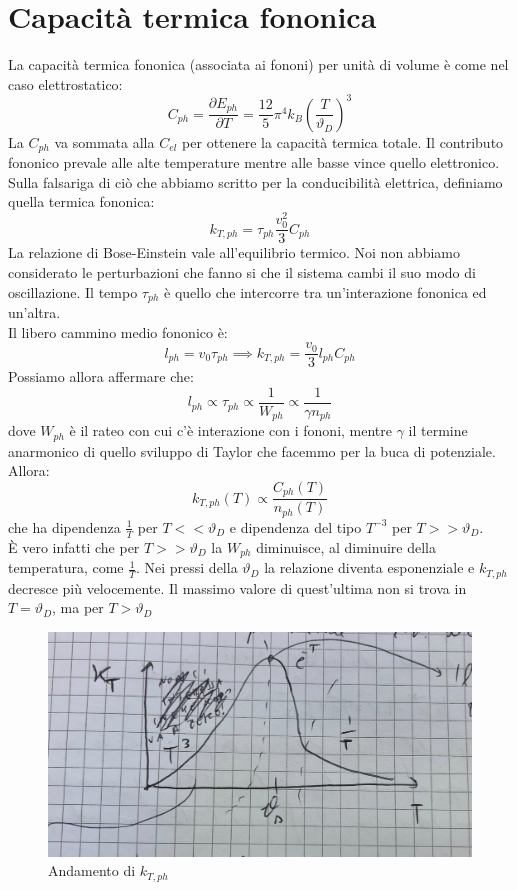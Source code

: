 \documentclass{book}
\begin{document}
    \section{Capacità termica fononica}
        La capacità termica fononica (associata ai fononi) per unità di volume è come nel caso elettrostatico:
        $$C_{ph} = \frac{\partial E_{ph}}{\partial T} = \frac{12}{5}\pi ^{4}k_{B}(\frac{T}{\vartheta_{D}})^{3}$$
        La $C_{ph}$ va sommata alla $C_{el}$ per ottenere la capacità termica totale. Il contributo fononico prevale alle alte temperature mentre alle basse vince quello elettronico.\\
        Sulla falsariga di ciò che abbiamo scritto per la conducibilità elettrica, definiamo quella termica fononica:
        $$k_{T, ph} = \tau_{ph} \frac{v_{0} ^{2}}{3}C_{ph}$$
        La relazione di Bose-Einstein vale all'equilibrio termico. Noi non abbiamo considerato le perturbazioni che fanno si che il sistema cambi il suo modo di oscillazione. Il tempo $\tau_{ph}$ è quello che intercorre tra un'interazione fononica ed un'altra.\\
        Il libero cammino medio fononico è:
        $$l_{ph} = v_{0} \tau_{ph} \implies k_{T,ph} = \frac{v_{0}}{3}l_{ph}C_{ph}$$
        Possiamo allora affermare che:
        $$l_{ph} \propto \tau_{ph} \propto \frac{1}{W_{ph}} \propto \frac{1}{\gamma n_{ph}}$$
        dove $W_{ph}$ è il rateo con cui c'è interazione con i fononi, mentre $\gamma$ il termine anarmonico di quello sviluppo di Taylor che facemmo per la buca di potenziale.\\
        Allora:
        $$k_{T, ph} (T) \propto \frac{C_{ph}(T)}{n_{ph}(T)}$$
        che ha dipendenza $\displaystyle \frac{1}{T}$ per $T<< \vartheta_{D}$ e dipendenza del tipo $T^{-3}$ per $T>> \vartheta_{D}$.\\
        È vero infatti che per $T>> \vartheta_{D}$ la $W_{ph}$ diminuisce, al diminuire della temperatura, come $\frac{1}{T}$.  Nei pressi della $\vartheta_{D}$ la relazione diventa esponenziale e $k_{T, ph}$ decresce più velocemente. Il massimo valore di quest'ultima non si trova in $T=\vartheta_{D}$, ma per $T> \vartheta_{D}$
        \begin{figure}[h!]
            \centering
            \includegraphics[width=0.5\linewidth]{img/asset2.png}
            \caption{Andamento di $k_{T, ph}$}
        \end{figure} \\
\end{document}
